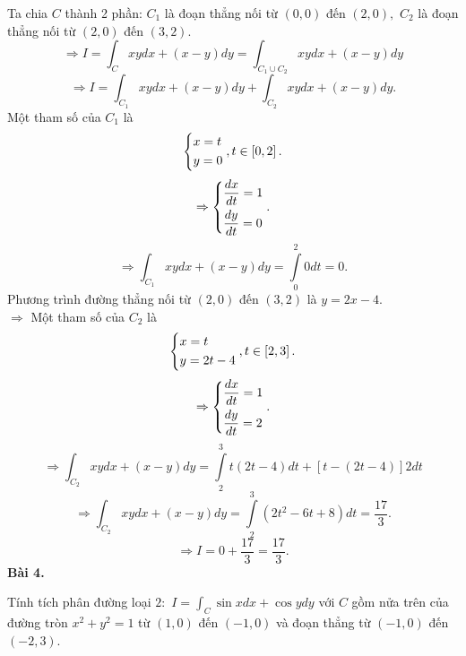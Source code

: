 \documentclass[12pt,a4paper]{article}
\begin{document}
Ta chia \(C\) thành 2 phần: \(C_1\) là đoạn thẳng nối từ \(\left( {0,0} \right)\) đến \(\left( {2,0} \right),\) \(C_2\) là đoạn thẳng nối từ \(\left( {2,0} \right)\) đến \(\left( {3,2} \right).\)
\[ \Rightarrow I = \int_C {xydx + \left( {x - y} \right)dy}  = \int_{{C_1} \cup {C_2}} {xydx + \left( {x - y} \right)dy} \]
\[ \Rightarrow I = \int_{{C_1}} {xydx + \left( {x - y} \right)dy}  + \int_{{C_2}} {xydx + \left( {x - y} \right)dy} .\]
Một tham số của \(C_1\) là
\[\left\{ \begin{gathered}
  x = t \hfill \\
  y = 0 \hfill \\ 
\end{gathered}  \right.,t \in \left[ {0,2} \right].\]
\[ \Rightarrow \left\{ \begin{gathered}
  \frac{{dx}}{{dt}} = 1 \hfill \\
  \frac{{dy}}{{dt}} = 0 \hfill \\ 
\end{gathered}  \right..\]
\[ \Rightarrow \int_{{C_1}} {xydx + \left( {x - y} \right)dy}  = \int\limits_0^2 {0dt}  = 0.\]
Phương trình đường thẳng  nối từ \(\left( {2,0} \right)\) đến \(\left( {3,2} \right)\) là \(y = 2x - 4.\)\\
\(\Rightarrow\) Một tham số của \(C_2\) là
\[\left\{ \begin{gathered}
  x = t \hfill \\
  y = 2t - 4 \hfill \\ 
\end{gathered}  \right.,t \in \left[ {2,3} \right].\]
\[ \Rightarrow \left\{ \begin{gathered}
  \frac{{dx}}{{dt}} = 1 \hfill \\
  \frac{{dy}}{{dt}} = 2 \hfill \\ 
\end{gathered}  \right..\]
\[ \Rightarrow \int_{{C_2}} {xydx + \left( {x - y} \right)dy}  = \int\limits_2^3 {t\left( {2t - 4} \right)dt + \left[ {t - \left( {2t - 4} \right)} \right]2dt} \]
\[ \Rightarrow \int_{{C_2}} {xydx + \left( {x - y} \right)dy}  = \int\limits_2^3 {\left( {2{t^2} - 6t + 8} \right)dt}  = \frac{{17}}{3}.\]
\[ \Rightarrow I = 0 + \frac{{17}}{3} = \frac{{17}}{3}.\]
\textbf{Bài 4.}
\begin{mybox}
Tính tích phân đường loại \(2:\) \(I = \int_C {\sin xdx + \cos ydy} \) với \(C\) gồm nửa trên của đường tròn \({x^2} + {y^2} = 1\) từ \(\left( {1,0} \right)\) đến \(\left( { - 1,0} \right)\) và đoạn thẳng từ \(\left( { - 1,0} \right)\) đến \(\left( { - 2,3} \right).\)
\end{mybox}
\end{document}
